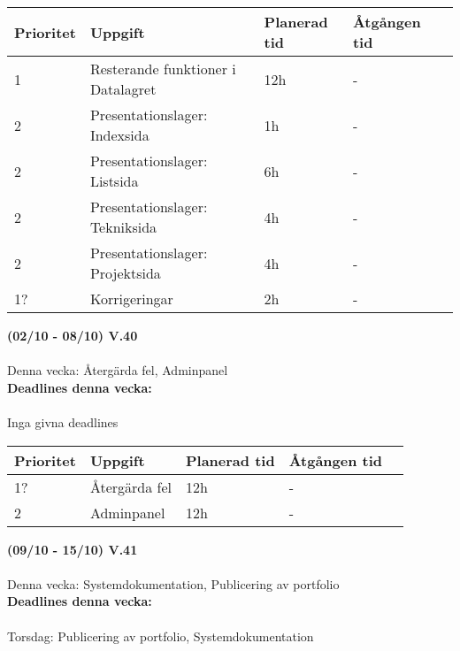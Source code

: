 \documentclass{TDP003mall}
\begin{document}
\begin{table}[]
  \begin{tabular}{|l|l|l|l|l|}
  \hline
   Prioritet & Uppgift                    & Planerad tid & Åtgången tid \\ \hline
   1         & Resterande funktioner i Datalagret & 12h          & -          \\ \hline
   2        & Presentationslager: Indexsida  & 1h           & -       \\ \hline
   2        & Presentationslager: Listsida &6h          & -       \\ \hline
   2         & Presentationslager: Tekniksida & 4h          & -           \\ \hline
   2         & Presentationslager: Projektsida & 4h         & - \\ \hline
   1?    & Korrigeringar & 2h         & - \\ \hline
  \end{tabular}
  \end{table}

  \hrulefill

  
\textbf{(02/10 - 08/10) V.40}\\\\
Denna vecka: Återgärda fel, Adminpanel\\

\textbf{Deadlines denna vecka: }\\\\
Inga givna deadlines


\begin{table}[]
\begin{tabular}{|l|l|l|l|l|}
\hline
 Prioritet & Uppgift                    & Planerad tid & Åtgången tid \\ \hline
 1?        & Återgärda fel  & 12h          & -          \\ \hline
 2         & Adminpanel & 12h           & -       \\ \hline
\end{tabular}
\end{table}

\vspace{3em}

\textbf{(09/10 - 15/10) V.41}\\\\
Denna vecka: Systemdokumentation, Publicering av portfolio\\

\textbf{Deadlines denna vecka: }\\\\
Torsdag: Publicering av portfolio, Systemdokumentation
\end{document}
